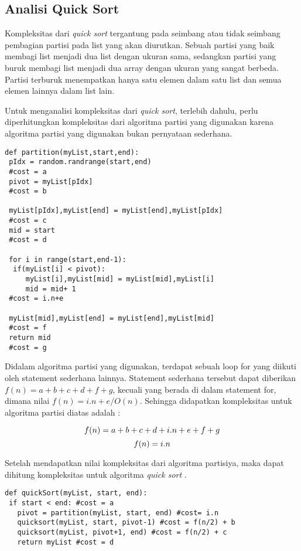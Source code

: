 \documentclass[12pt]{book}%
\begin{document}
\subsection{Analisi Quick Sort}
Kompleksitas dari \textit{quick sort} tergantung pada  seimbang atau tidak seimbang pembagian partisi pada list yang akan diurutkan. Sebuah partisi yang  baik membagi list menjadi dua list dengan ukuran sama, sedangkan partisi yang buruk membagi list menjadi dua array dengan ukuran yang sangat berbeda. Partisi terburuk menempatkan hanya satu elemen dalam satu list dan semua elemen lainnya dalam list lain. 

Untuk menganalisi kompleksitas dari \textit{quick sort}, terlebih dahulu, perlu diperhitungkan kompleksitas dari algoritma partisi yang digunakan karena algoritma partisi yang digunakan bukan pernyataan sederhana.

\lstset{language=Python}
\label{lst:Partition}
\begin{lstlisting}[frame=single]
def partition(myList,start,end):
 pIdx = random.randrange(start,end) 
 #cost = a
 pivot = myList[pIdx]
 #cost = b
 
 myList[pIdx],myList[end] = myList[end],myList[pIdx]
 #cost = c 
 mid = start
 #cost = d

 for i in range(start,end-1):
  if(myList[i] < pivot):
	 myList[i],myList[mid] = myList[mid],myList[i]
	 mid = mid+ 1
 #cost = i.n+e

 myList[mid],myList[end] = myList[end],myList[mid]
 #cost = f
 return mid
 #cost = g
\end{lstlisting}

Didalam algoritma partisi yang digunakan, terdapat sebuah loop for yang diikuti oleh statement sederhana lainnya. Statement sederhana tersebut dapat diberikan $f(n)= a+b+c+d+f+g$, kecuali yang berada di dalam statement for, dimana nilai $f(n) = i.n+e /O(n)$. Sehingga didapatkan kompleksitas untuk algoritma partisi diatas adalah :

$$ \mathnormal{f(n) = a+b+c+d+i.n+e+f+g} $$
$$ \mathnormal{f(n) = i.n} $$

Setelah mendapatkan nilai kompleksitas dari algoritma partisiya, maka dapat dihitung kompleksitas untuk algoritma \textit{quick sort} .

\lstset{language=Python}
\label{lst:QuickSort}
\begin{lstlisting}[frame=single]
def quickSort(myList, start, end):
 if start < end: #cost = a
   pivot = partition(myList, start, end) #cost= i.n
   quicksort(myList, start, pivot-1) #cost = f(n/2) + b
   quicksort(myList, pivot+1, end) #cost = f(n/2) + c
   return myList #cost = d
\end{lstlisting}
\end{document}
